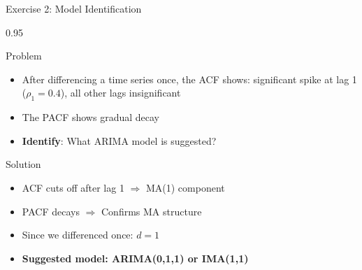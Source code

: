 \documentclass[9pt, aspectratio=169, t]{beamer}
\begin{document}
\begin{frame}{Exercise 2: Model Identification}
    \begin{cminipage}{0.95\textwidth}
    \begin{alertblock}{Problem}
        \begin{itemize}\setlength{\itemsep}{0pt}
            \item After differencing a time series once, the ACF shows: significant spike at lag 1 ($\rho_1 = 0.4$), all other lags insignificant
            \item The PACF shows gradual decay
            \item \textbf{Identify}: What ARIMA model is suggested?
        \end{itemize}
    \end{alertblock}

    \vspace{0.2cm}
    \begin{exampleblock}{Solution}
        \begin{itemize}\setlength{\itemsep}{0pt}
            \item ACF cuts off after lag 1 $\Rightarrow$ MA(1) component
            \item PACF decays $\Rightarrow$ Confirms MA structure
            \item Since we differenced once: $d = 1$
            \item \textbf{Suggested model: ARIMA(0,1,1) or IMA(1,1)}
        \end{itemize}
    \end{exampleblock}
    \end{cminipage}
\end{frame}
\end{document}
